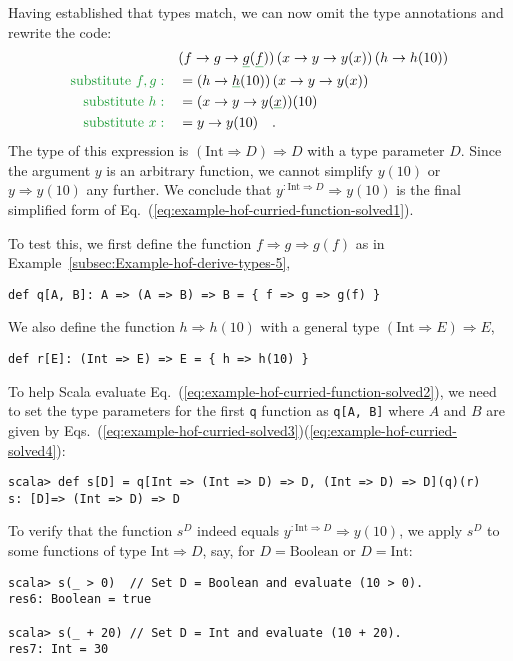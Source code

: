 Having established that types match, we can now omit the type annotations
and rewrite the code:
\begin{align*}
 & (f\Rightarrow g\Rightarrow\gunderline g(\gunderline f))\left(x\Rightarrow y\Rightarrow y(x)\right)\left(h\Rightarrow h(10)\right)\\
{\color{greenunder}\text{substitute }f,g:}\quad & =(h\Rightarrow\gunderline h(10))\left(x\Rightarrow y\Rightarrow y(x)\right)\\
{\color{greenunder}\text{substitute }h:}\quad & =(x\Rightarrow y\Rightarrow y(\gunderline x))(10)\\
{\color{greenunder}\text{substitute }x:}\quad & =y\Rightarrow y(10)\quad.
\end{align*}
The type of this expression is $\left(\text{Int}\Rightarrow D\right)\Rightarrow D$
with a type parameter $D$. Since the argument $y$ is an arbitrary
function, we cannot simplify $y(10)$ or $y\Rightarrow y(10)$ any
further. We conclude that $y^{:\text{Int}\Rightarrow D}\Rightarrow y(10)$
is the final simplified form of Eq.~(\ref{eq:example-hof-curried-function-solved1}).

To test this, we first define the function $f\Rightarrow g\Rightarrow g(f)$
as in Example~\ref{subsec:Example-hof-derive-types-5},
\begin{lstlisting}
def q[A, B]: A => (A => B) => B = { f => g => g(f) }
\end{lstlisting}
We also define the function $h\Rightarrow h(10)$ with a general type
$\left(\text{Int}\Rightarrow E\right)\Rightarrow E$,
\begin{lstlisting}
def r[E]: (Int => E) => E = { h => h(10) }
\end{lstlisting}
To help Scala evaluate Eq.~(\ref{eq:example-hof-curried-function-solved2}),
we need to set the type parameters for the first \lstinline!q! function
as \lstinline!q[A, B]! where $A$ and $B$ are given by Eqs.~(\ref{eq:example-hof-curried-solved3})\textendash (\ref{eq:example-hof-curried-solved4}):
\begin{lstlisting}
scala> def s[D] = q[Int => (Int => D) => D, (Int => D) => D](q)(r)
s: [D]=> (Int => D) => D
\end{lstlisting}
To verify that the function $s^{D}$ indeed equals $y^{:\text{Int}\Rightarrow D}\Rightarrow y(10)$,
we apply $s^{D}$ to some functions of type $\text{Int}\Rightarrow D$,
say, for $D=\text{Boolean}$ or $D=\text{Int}$:
\begin{lstlisting}
scala> s(_ > 0)  // Set D = Boolean and evaluate (10 > 0).
res6: Boolean = true

scala> s(_ + 20) // Set D = Int and evaluate (10 + 20).
res7: Int = 30
\end{lstlisting}


